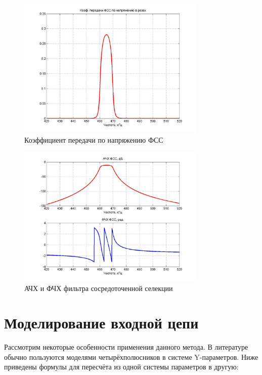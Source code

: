 \begin{figure}[H] \centering
  \includegraphics[width=0.8\textwidth]{./content/RIs007.jpg}
  \caption{Коэффициент передачи по напряжению ФСС} \label{p:RIs007}
\end{figure}


\begin{figure}[H] \centering
  \includegraphics[width=0.8\textwidth]{./content/RIs008.jpg}
  \caption{АЧХ и ФЧХ фильтра сосредоточенной селекции} \label{p:RIs008}
\end{figure}







\section{Моделирование входной цепи}

Рассмотрим  некоторые  особенности  применения  данного  метода.  В литературе обычно пользуются моделями четырёхполюсников в системе Y-параметров.  Ниже  приведены  формулы  для  пересчёта  из  одной  системы параметров в другую:  

